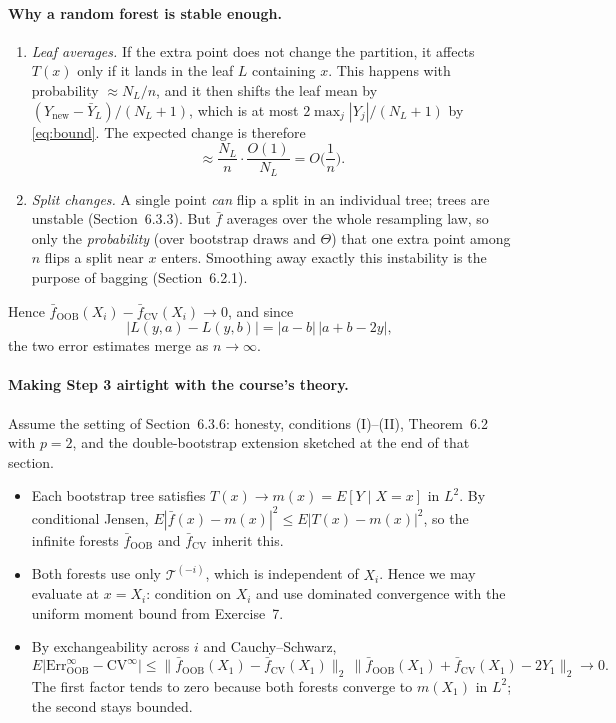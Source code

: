 \documentclass[11pt,a4paper]{article}
\theoremstyle{remark}
\newcommand{\cT}{\mathcal T}
\newcommand{\1}{\mathbf 1}
\newcommand{\fOOB}{\bar f_{\mathrm{OOB}}}
\newcommand{\fCV}{\bar f_{\mathrm{CV}}}
\begin{document}
\paragraph{Why a random forest is stable enough.}
\begin{enumerate}[label=(\roman*)]
\item \emph{Leaf averages.} If the extra point does not change the partition, it affects $T(x)$ only if it lands in the leaf $L$ containing $x$. This happens with probability $\approx N_L/n$, and it then shifts the leaf mean by $(Y_{\mathrm{new}}-\bar Y_L)/(N_L+1)$, which is at most $2\max_j|Y_j|/(N_L+1)$ by \eqref{eq:bound}. The expected change is therefore
\[
\approx\frac{N_L}{n}\cdot\frac{O(1)}{N_L}=O\Big(\frac1n\Big).
\]
\item \emph{Split changes.} A single point \emph{can} flip a split in an individual tree; trees are unstable (Section~6.3.3). But $\bar f$ averages over the whole resampling law, so only the \emph{probability} (over bootstrap draws and $\Theta$) that one extra point among $n$ flips a split near $x$ enters. Smoothing away exactly this instability is the purpose of bagging (Section~6.2.1).
\end{enumerate}
Hence $\fOOB(X_i)-\fCV(X_i)\to0$, and since
\[
|L(y,a)-L(y,b)|=|a-b|\,|a+b-2y|,
\]
the two error estimates merge as $n\to\infty$.

\paragraph{Making Step 3 airtight with the course's theory.}
Assume the setting of Section~6.3.6: honesty, conditions (I)--(II), Theorem~6.2 with $p=2$, and the double-bootstrap extension sketched at the end of that section.
\begin{itemize}
\item Each bootstrap tree satisfies $T(x)\to m(x)=E[Y\mid X=x]$ in $L^2$. By conditional Jensen, $E|\bar f(x)-m(x)|^2\le E|T(x)-m(x)|^2$, so the infinite forests $\fOOB$ and $\fCV$ inherit this.
\item Both forests use only $\cT^{(-i)}$, which is independent of $X_i$. Hence we may evaluate at $x=X_i$: condition on $X_i$ and use dominated convergence with the uniform moment bound from Exercise~7.
\item By exchangeability across $i$ and Cauchy--Schwarz,
\[
E\big|\mathrm{Err}^\infty_{\mathrm{OOB}}-\mathrm{CV}^\infty\big|
\le\big\|\fOOB(X_1)-\fCV(X_1)\big\|_2\,
\big\|\fOOB(X_1)+\fCV(X_1)-2Y_1\big\|_2\longrightarrow0.
\]
The first factor tends to zero because both forests converge to $m(X_1)$ in $L^2$; the second stays bounded.
\end{itemize}
\end{document}
